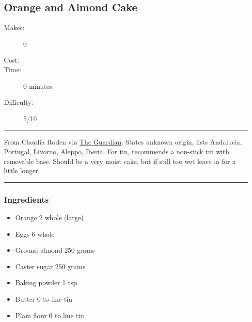 \documentclass[]{article}
\begin{document}
\subsection*{\center\huge Orange and Almond Cake}
\begin{description}
\item[Makes:] 0 
\item[Cost:] \textdollar
\item[Time:] 0 minutes
\item[Difficulty:] 5/10
\end{description}
\vspace{0.2cm}\hrule\vspace{0.5cm}
\begin{adjustwidth}{0.5 cm}{0.5 cm}

From Claudia Roden via \href{https://www.theguardian.com/food/2022/sep/26/claudia-roden-recipe-for-orange-and-almond-cake}{The Guardian}. States unknown origin, lists Andalucia, Portugal, Livorno, Aleppo, Iberia. For tin, recommends a non-stick tin with removable base. Should be a very moist cake, but if still too wet leave in for a little longer. \hfill{}\color{black}

\end{adjustwidth}
\vspace{0.5cm}\hrule
\subsubsection*{\Large Ingredients}
\begin{multicols}{2}
\begin{itemize}
 \item Orange \hfill 2 whole (large)
 \item Eggs \hfill 6 whole
 \item Ground almond \hfill 250 grams
 \item Caster sugar \hfill 250 grams
 \item Baking powder \hfill 1 tsp
 \item Butter \hfill 0 to line tin
 \item Plain flour \hfill 0 to line tin
\end{itemize}
\end{multicols}
\end{document}
